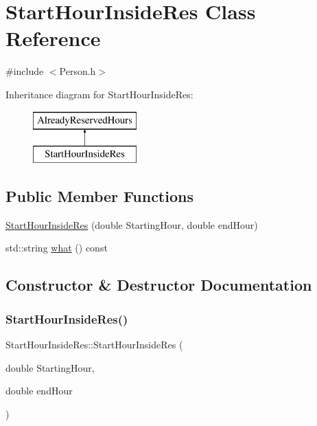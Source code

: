 \hypertarget{class_start_hour_inside_res}{}\section{Start\+Hour\+Inside\+Res Class Reference}
\label{class_start_hour_inside_res}


{\ttfamily \#include $<$Person.\+h$>$}

Inheritance diagram for Start\+Hour\+Inside\+Res\+:\begin{figure}[H]
\begin{center}
\leavevmode
\includegraphics[height=2.000000cm]{class_start_hour_inside_res}
\end{center}
\end{figure}
\subsection*{Public Member Functions}
\begin{DoxyCompactItemize}
\item 
\mbox{\hyperlink{class_start_hour_inside_res_a6c05984e1473ec49ce644ecfaecab8fc}{Start\+Hour\+Inside\+Res}} (double Starting\+Hour, double end\+Hour)
\item 
std\+::string \mbox{\hyperlink{class_start_hour_inside_res_a90b45cf2a2d4f0adcf7d9f650bee1574}{what}} () const
\end{DoxyCompactItemize}


\subsection{Constructor \& Destructor Documentation}
\mbox{\label{class_start_hour_inside_res_a6c05984e1473ec49ce644ecfaecab8fc}} 
\subsubsection{\texorpdfstring{Start\+Hour\+Inside\+Res()}{StartHourInsideRes()}}
{\footnotesize\ttfamily Start\+Hour\+Inside\+Res\+::\+Start\+Hour\+Inside\+Res (\begin{DoxyParamCaption}\item[{double}]{Starting\+Hour,  }\item[{double}]{end\+Hour }\end{DoxyParamCaption})\hspace{0.3cm}{\ttfamily [inline]}}



